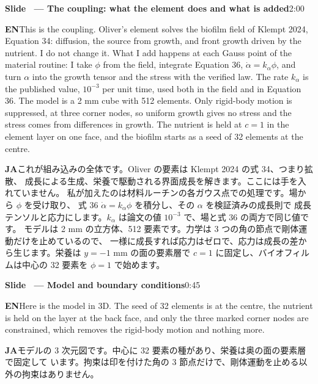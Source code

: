 \documentclass[11pt,a4paper]{article}
\newcounter{sl}
\newcommand{\slide}[2]{\stepcounter{sl}\vspace{8pt}%
  {\color{c3}\large\bfseries Slide \thesl\ --- #1}\hfill{\small #2}\par\vspace{2pt}}
\newcommand{\EN}{\textbf{EN}\quad}
\newcommand{\JA}{\par\textbf{JA}\quad}
\begin{document}
\slide{The coupling: what the element does and what is added}{2:00}
\EN This is the coupling. Oliver's element solves the biofilm field of
Klempt 2024, Equation 34: diffusion, the source from growth, and front
growth driven by the nutrient. I do not change it. What I add happens at
each Gauss point of the material routine: I take $\phi$ from the field,
integrate Equation 36, $\dot\alpha=k_\alpha\phi$, and turn $\alpha$ into the
growth tensor and the stress with the verified law. The rate $k_\alpha$ is the
published value, $10^{-3}$ per unit time, used both in the field and in
Equation 36.
The model is a 2 mm cube with 512 elements. Only rigid-body motion is
suppressed, at three corner nodes, so uniform growth gives no stress and the
stress comes from differences in growth. The nutrient is held at $c=1$ in the
element layer on one face, and the biofilm starts as a seed of 32 elements
at the centre.
\JA これが組み込みの全体です。Oliver の要素は Klempt 2024 の式 34、つまり拡散、
成長による生成、栄養で駆動される界面成長を解きます。ここには手を入れていません。
私が加えたのは材料ルーチンの各ガウス点での処理です。場から $\phi$ を受け取り、
式 36 $\dot\alpha=k_\alpha\phi$ を積分し、その $\alpha$ を検証済みの成長則で
成長テンソルと応力にします。$k_\alpha$ は論文の値 $10^{-3}$ で、場と式 36 の両方で同じ値です。
モデルは 2 mm の立方体、512 要素です。力学は 3 つの角の節点で剛体運動だけを止めているので、
一様に成長すれば応力はゼロで、応力は成長の差から生じます。栄養は $y=-1$ mm の面の要素層で
$c=1$ に固定し、バイオフィルムは中心の 32 要素を $\phi=1$ で始めます。

\slide{Model and boundary conditions}{0:45}
\EN Here is the model in 3D. The seed of 32 elements is at the centre, the
nutrient is held on the layer at the back face, and only the three marked
corner nodes are constrained, which removes the rigid-body motion and
nothing more.
\JA モデルの 3 次元図です。中心に 32 要素の種があり、栄養は奥の面の要素層で固定して
います。拘束は印を付けた角の 3 節点だけで、剛体運動を止める以外の拘束はありません。
\end{document}
